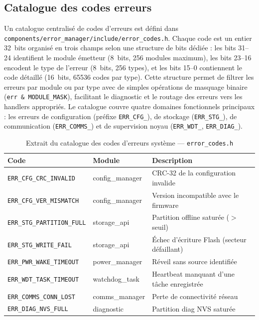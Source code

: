 \subsection{Catalogue des codes erreurs}
\label{subsec:errcodes}

Un catalogue centralisé de codes d'erreurs est défini dans
\texttt{components/error\_manager/include/error\_codes.h}. Chaque
code est un entier 32~bits organisé en trois champs selon une structure
de bits dédiée : les bits 31--24 identifient le module émetteur
(8~bits, 256 modules maximum), les bits 23--16 encodent le type de
l'erreur (8~bits, 256 types), et les bits 15--0 contiennent le code
détaillé (16~bits, 65536 codes par type). Cette structure permet de
filtrer les erreurs par module ou par type avec de simples opérations
de masquage binaire (\texttt{err \& MODULE\_MASK}), facilitant le
diagnostic et le routage des erreurs vers les handlers appropriés.
Le catalogue couvre quatre domaines fonctionnels principaux : les
erreurs de configuration (préfixe \texttt{ERR\_CFG\_}), de stockage
(\texttt{ERR\_STG\_}), de communication (\texttt{ERR\_COMMS\_}) et
de supervision noyau (\texttt{ERR\_WDT\_}, \texttt{ERR\_DIAG\_}).

\begin{table}[H]
\centering
\renewcommand{\arraystretch}{1.5}
\caption{Extrait du catalogue des codes d'erreurs système --- \texttt{error\_codes.h}}
\label{tab:errcodes}
\small
\begin{tabular}{|l|p{2.2cm}|p{5.5cm}|}
\hline
\rowcolor{gray!20}
\textbf{Code} & \textbf{Module} & \textbf{Description} \\
\hline
\texttt{ERR\_CFG\_CRC\_INVALID}    & config\_manager & CRC-32 de la configuration invalide \\
\hline
\texttt{ERR\_CFG\_VER\_MISMATCH}   & config\_manager & Version incompatible avec le firmware \\
\hline
\texttt{ERR\_STG\_PARTITION\_FULL} & storage\_api    & Partition offline saturée ($>$seuil) \\
\hline
\texttt{ERR\_STG\_WRITE\_FAIL}     & storage\_api    & Échec d'écriture Flash (secteur défaillant) \\
\hline
\texttt{ERR\_PWR\_WAKE\_TIMEOUT}   & power\_manager  & Réveil sans source identifiée \\
\hline
\texttt{ERR\_WDT\_TASK\_TIMEOUT}   & watchdog\_task  & Heartbeat manquant d'une tâche enregistrée \\
\hline
\texttt{ERR\_COMMS\_CONN\_LOST}    & comms\_manager  & Perte de connectivité réseau \\
\hline
\texttt{ERR\_DIAG\_NVS\_FULL}      & diagnostic      & Partition diag NVS saturée \\
\hline
\end{tabular}
\end{table}


